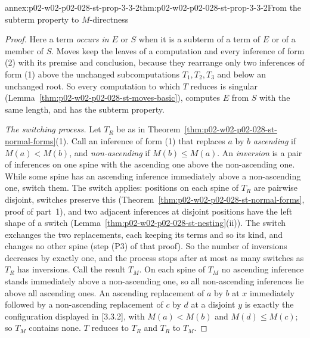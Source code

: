 \begin{annexitem}{annex:p02-w02-p02-028-st-prop-3-3-2}{thm:p02-w02-p02-028-st-prop-3-3-2}{From the subterm property to \(M\)-directness}
\begin{proof}
Here a term \emph{occurs in} \(E\) or \(S\) when it is a subterm of a term of
\(E\) or of a member of \(S\).  Moves keep the leaves of a computation and
every inference of form (2) with its premise and conclusion, because they
rearrange only two inferences of form (1) above the unchanged
subcomputations \(T_1,T_2,T_3\) and below an unchanged root.  So every
computation to which \(T\) reduces is singular
(Lemma~\ref{thm:p02-w02-p02-028-st-moves-basic}), computes \(E\) from \(S\)
with the same length, and has the subterm property.

\emph{The switching process.}  Let \(T_R\) be as in
Theorem~\ref{thm:p02-w02-p02-028-st-normal-forms}(1).  Call an inference of
form (1) that replaces \(a\) by \(b\) \emph{ascending} if \(M(a)<M(b)\), and
\emph{non-ascending} if \(M(b)\leq M(a)\).  An \emph{inversion} is a pair of
inferences on one spine with the ascending one above the non-ascending one.
While some spine has an ascending inference immediately above a
non-ascending one, switch them.  The switch applies: positions on each spine
of \(T_R\) are pairwise disjoint, switches preserve this
(Theorem~\ref{thm:p02-w02-p02-028-st-normal-forms}, proof of part~1), and two
adjacent inferences at disjoint positions have the left shape of a switch
(Lemma~\ref{thm:p02-w02-p02-028-st-nesting}(ii)).  The switch exchanges the
two replacements, each keeping its terms and so its kind, and changes no
other spine (step (P3) of that proof).  So the number of inversions decreases
by exactly one, and the process stops after at most as many switches as
\(T_R\) has inversions.  Call the result \(T_M\).  On each spine of \(T_M\)
no ascending inference stands immediately above a non-ascending one, so all
non-ascending inferences lie above all ascending ones.  An ascending
replacement of \(a\) by \(b\) at \(x\) immediately followed by a
non-ascending replacement of \(c\) by \(d\) at a disjoint \(y\) is exactly
the configuration displayed in [3.3.2], with \(M(a)<M(b)\) and
\(M(d)\leq M(c)\); so \(T_M\) contains none.  \(T\) reduces to \(T_R\) and
\(T_R\) to \(T_M\).


\end{proof}
\end{annexitem}
